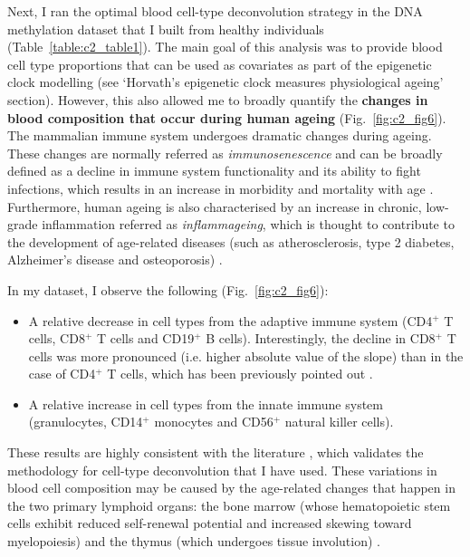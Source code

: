 Next, I ran the optimal blood cell-type deconvolution strategy in the DNA methylation dataset that I built from healthy individuals (Table~\ref{table:c2_table1}). The main goal of this analysis was to provide blood cell type proportions that can be used as covariates as part of the epigenetic clock modelling (see `Horvath's epigenetic clock measures physiological ageing' section). However, this also allowed me to broadly quantify the \textbf{changes in blood composition that occur during human ageing} (Fig.~\ref{fig:c2_fig6}). The mammalian immune system undergoes dramatic changes during ageing. These changes are normally referred as \textit{immunosenescence} and can be broadly defined as a decline in immune system functionality and its ability to fight infections, which results in an increase in morbidity and mortality with age \cite{Nikolich-Zugich2018}. Furthermore, human ageing is also characterised by an increase in chronic, low-grade inflammation referred as \textit{inflammageing}, which is thought to contribute to the development of age-related diseases (such as atherosclerosis, type 2 diabetes, Alzheimer’s disease and osteoporosis) \cite{Franceschi2007}.

\bigskip

In my dataset, I observe the following (Fig.~\ref{fig:c2_fig6}):

\begin{itemize}
	
	\item A relative decrease in cell types from the adaptive immune system (CD4$^+$ T cells, CD8$^+$ T cells and CD19$^+$ B cells). Interestingly, the decline in CD8$^+$ T cells was more pronounced (i.e. higher absolute value of the slope) than in the case of CD4$^+$ T cells, which has been previously pointed out \cite{Czesnikiewicz-Guzik2008}. 
	
	\item A relative increase in cell types from the innate immune system (granulocytes, CD14$^+$ monocytes and CD56$^+$ natural killer cells).
	
\end{itemize}

These results are highly consistent with the literature \cite{Jaffe2014,Czesnikiewicz-Guzik2008,Kuranda2011,Chen2016a,Seidler2010,Manser2016}, which validates the methodology for cell-type deconvolution that I have used. These variations in blood cell composition may be caused by the age-related changes that happen in the two primary lymphoid organs: the bone marrow (whose hematopoietic stem cells exhibit reduced self-renewal potential and increased skewing toward myelopoiesis) and the thymus (which undergoes tissue involution)  \cite{Chinn2012}. 

